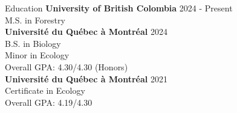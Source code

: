 \documentclass[
	11pt, %
]{resume} %
\begin{document}

\begin{rSection}{Education}
	\textbf{University of British Colombia} \hfill 2024 - Present\\
	M.S. in Forestry
	\smallskip \\
	\textbf{Université du Québec à Montréal} \hfill 2024 \\ 
	B.S. in Biology\\ 
	Minor in Ecology \\ 
	Overall GPA: 4.30/4.30 (Honors)
	\smallskip \\
	\textbf{Université du Québec à Montréal} \hfill 2021 \\ 
	Certificate in Ecology\\ 
	Overall GPA: 4.19/4.30
	
\end{rSection}
\end{document}
